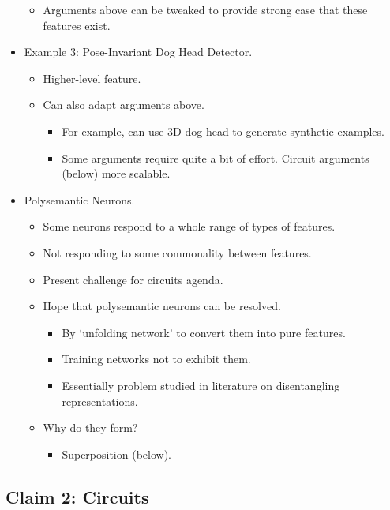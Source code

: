 \begin{itemize}
\begin{itemize}
        \item Arguments above can be tweaked to provide strong case that these features exist.
    \end{itemize}
    \pagebreak
    \item Example 3: Pose-Invariant Dog Head Detector.
    \begin{itemize}
        \item Higher-level feature.
        \item Can also adapt arguments above.
        \begin{itemize}
            \item For example, can use 3D dog head to generate synthetic examples.
            \item Some arguments require quite a bit of effort. Circuit arguments (below) more scalable.
        \end{itemize}
    \end{itemize}
    \item Polysemantic Neurons.
    \begin{itemize}
        \item Some neurons respond to a whole range of types of features.
        \item Not responding to some commonality between features.
        \item Present challenge for circuits agenda.
        \item Hope that polysemantic neurons can be resolved.
        \begin{itemize}
            \item By `unfolding network' to convert them into pure features.
            \item Training networks not to exhibit them.
            \item Essentially problem studied in literature on disentangling representations.
        \end{itemize}
        \item Why do they form?
        \begin{itemize}
            \item Superposition (below).
        \end{itemize}
    \end{itemize}
\end{itemize}


\subsection{Claim 2: Circuits}

